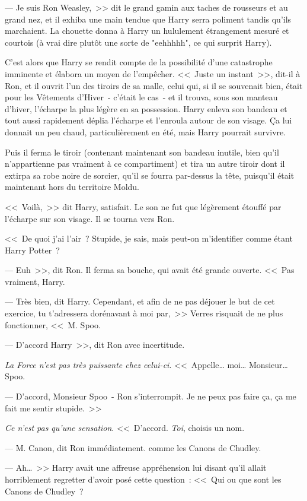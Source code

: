 --- Je suis Ron Weasley,~>> dit le grand gamin aux taches de rousseurs et au grand nez, et il exhiba une main tendue que Harry serra poliment tandis qu'ils marchaient. La chouette donna à Harry un hululement étrangement mesuré et courtois (à vrai dire plutôt une sorte de "eehhhhh", ce qui surprit Harry).

C'est alors que Harry se rendit compte de la possibilité d'une catastrophe imminente et élabora un moyen de l'empêcher. <<~Juste un instant~>>, dit-il à Ron, et il ouvrit l'un des tiroirs de sa malle, celui qui, si il se souvenait bien, était pour les Vêtements d'Hiver~- c'était le cas~- et il trouva, sous son manteau d'hiver, l'écharpe la plus légère en sa possession. Harry enleva son bandeau et tout aussi rapidement déplia l'écharpe et l'enroula autour de son visage. Ça lui donnait un peu chaud, particulièrement en été, mais Harry pourrait survivre.

Puis il ferma le tiroir (contenant maintenant son bandeau inutile, bien qu'il n'appartienne pas vraiment à ce compartiment) et tira un autre tiroir dont il extirpa sa robe noire de sorcier, qu'il se fourra par-dessus la tête, puisqu'il était maintenant hors du territoire Moldu.

<<~Voilà,~>> dit Harry, satisfait. Le son ne fut que légèrement étouffé par l'écharpe sur son visage. Il se tourna vers Ron.

<<~De quoi j'ai l'air~? Stupide, je sais, mais peut-on m'identifier comme étant Harry Potter~?

--- Euh~>>, dit Ron. Il ferma sa bouche, qui avait été grande ouverte. <<~Pas vraiment, Harry.

--- Très bien, dit Harry. Cependant, et afin de ne pas déjouer le but de cet exercice, tu t'adressera dorénavant à moi par,~>> Verres risquait de ne plus fonctionner, <<~M. Spoo.

--- D'accord Harry~>>, dit Ron avec incertitude.

\emph{La Force n'est pas très puissante chez celui-ci}. <<~Appelle… moi… Monsieur… Spoo.

--- D'accord, Monsieur Spoo~- Ron s'interrompit. Je ne peux pas faire ça, ça me fait me sentir stupide.~>>

\emph{Ce n'est pas qu'une sensation}. <<~D'accord. \emph{Toi}, choisis un nom.

--- M. Canon, dit Ron immédiatement. comme les Canons de Chudley.

--- Ah…~>> Harry avait une affreuse appréhension lui disant qu'il allait horriblement regretter d'avoir posé cette question~: <<~Qui ou que sont les Canons de Chudley~?

